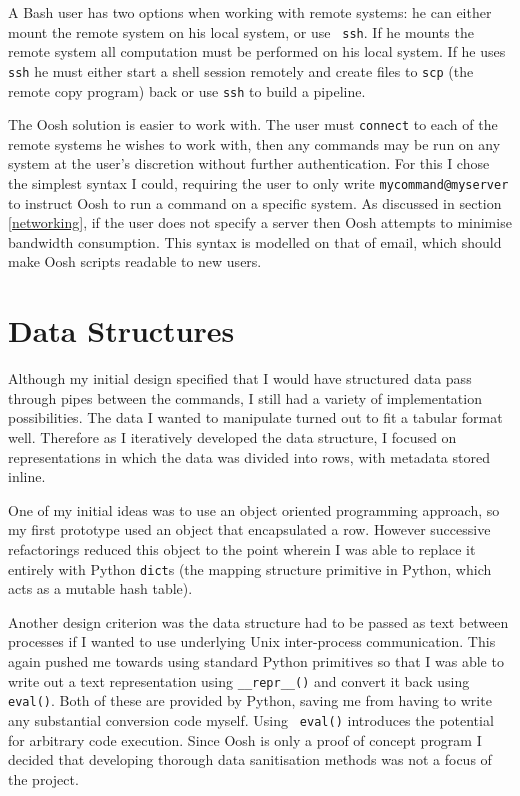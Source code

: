 \documentclass[12pt,twoside,notitlepage]{report}
\begin{document}
A Bash user has two options when working with remote systems: he can
either mount the remote system on his local system, or use {\tt
  ssh}. If he mounts the remote system all computation must be
performed on his local system. If he uses {\tt ssh} he must either
start a shell session remotely and create files to {\tt scp} (the
remote copy program) back or use {\tt ssh} to build a pipeline.

The Oosh solution is easier to work with. The user must {\tt connect}
to each of the remote systems he wishes to work with, then any
commands may be run on any system at the user's discretion without
further authentication. For this I chose the simplest syntax I could,
requiring the user to only write {\tt mycommand@myserver} to instruct
Oosh to run a command on a specific system. As discussed in section
\ref{networking}, if the user does not specify a server then Oosh
attempts to minimise bandwidth consumption. This syntax is modelled on
that of email, which should make Oosh scripts readable to new users.

\section{Data Structures}
Although my initial design specified that I would have structured data
pass through pipes between the commands, I still had a variety of
implementation possibilities. The data I wanted to manipulate turned
out to fit a tabular format well. Therefore as I iteratively developed
the data structure, I focused on representations in which the data was
divided into rows, with metadata stored inline.

One of my initial ideas was to use an object oriented programming
approach, so my first prototype used an object that encapsulated a
row. However successive refactorings reduced this object to the point
wherein I was able to replace it entirely with Python {\tt dict}s (the
mapping structure primitive in Python, which acts as a mutable hash
table).

Another design criterion was the data structure had to be passed as
text between processes if I wanted to use underlying Unix
inter-process communication. This again pushed me towards using
standard Python primitives so that I was able to write out a text
representation using {\tt \_\_repr\_\_()} and convert it back using
{\tt eval()}. Both of these are provided by Python, saving me from
having to write any substantial conversion code myself. Using {\tt
  eval()} introduces the potential for arbitrary code execution. Since
Oosh is only a proof of concept program I decided that developing
thorough data sanitisation methods was not a focus of the project.
\end{document}
